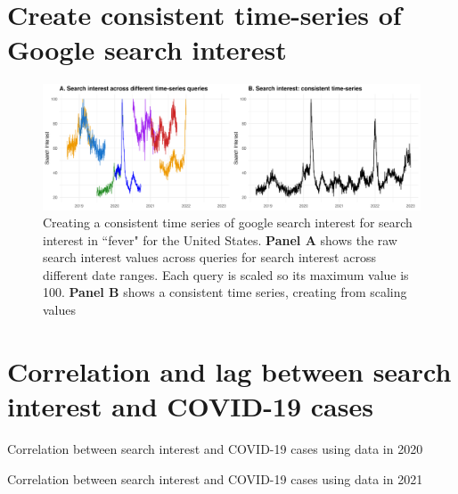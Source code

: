 \documentclass{article}
\begin{document}
\newpage
\section{Create consistent time-series of Google search interest}
\label{si:create_const_timeseries}

\begin{figure}[H]
\centering
    \includegraphics[width=1\textwidth]{figures/const_timeseries_ex.png}
    \caption{Creating a consistent time series of google search interest for search interest in ``fever" for the United States. {\bf Panel A} shows the raw search interest values across queries for search interest across different date ranges. Each query is scaled so its maximum value is 100. {\bf Panel B} shows a consistent time series, creating from scaling values}
    \label{fig:const_timeseries_ex}
\end{figure}

\newpage
\section{Correlation and lag between search interest and COVID-19 cases}
\label{si:cor_lag_add_results}

\begin{table}[H]
\caption{Correlation between search interest and COVID-19 cases using data in 2020}
\label{tab:cor_table_2020}
\centering
\begin{adjustbox}{width=0.8\textwidth}

\end{adjustbox}
\end{table}

\begin{table}[H]
\caption{Correlation between search interest and COVID-19 cases using data in 2021}
\label{tab:cor_table_2021}
\centering
\begin{adjustbox}{width=0.8\textwidth}

\end{adjustbox}
\end{table}
\end{document}
